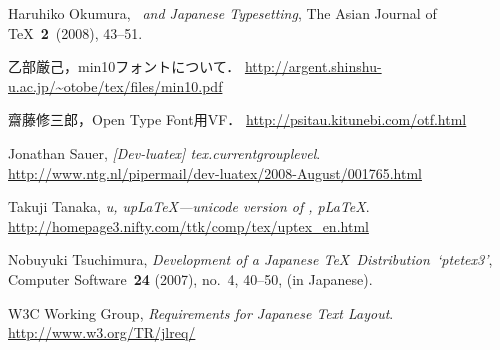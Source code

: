 \documentclass{ajt}
\begin{document}
\begin{thebibliography}{99}
Haruhiko Okumura, \emph{\pTeX\ and Japanese Typesetting},
	The Asian Journal of \TeX\ \textbf{2}~(2008), 43--51.

乙部厳己，min10フォントについて．
\url{http://argent.shinshu-u.ac.jp/~otobe/tex/files/min10.pdf}

齋藤修三郎，Open Type Font用VF．
\url{http://psitau.kitunebi.com/otf.html}

Jonathan Sauer, \emph{[Dev-luatex] tex.currentgrouplevel}. 
\url{http://www.ntg.nl/pipermail/dev-luatex/2008-August/001765.html}

Takuji Tanaka, \emph{u\pTeX, up\LaTeX---unicode version of \pTeX, p\LaTeX}.
\url{http://homepage3.nifty.com/ttk/comp/tex/uptex_en.html}

Nobuyuki Tsuchimura, \emph{Development of a Japanese \TeX\ Distribution~`ptetex3'},
Computer Software\ \textbf{24} (2007), no.~4, 40--50, (in Japanese).

W3C Working Group, \emph{Requirements for Japanese Text Layout}. 
\url{http://www.w3.org/TR/jlreq/}
\end{thebibliography}
\end{document}
